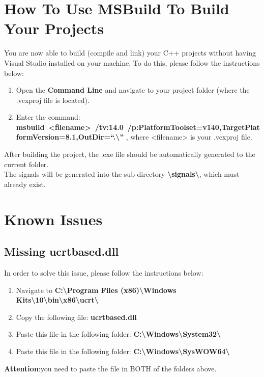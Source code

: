 \section{How To Use MSBuild To Build Your Projects}
  You are now able to build (compile and link) your C++ projects without having Visual Studio installed on your machine.
  To do this, please follow the instructions below:
  \begin{enumerate}
    \item Open the \textbf{Command Line} and navigate to your project folder (where the .vcxproj file is located).
    \item Enter the command:\\ \hbox{\textbf{msbuild <filename> /tv:14.0 /p:PlatformToolset=v140,TargetPlatformVersion=8.1,OutDir=``.\textbackslash{}''}} , where <filename> is your .vcxproj file.
  \end{enumerate}
  After building the project, the .exe file should be automatically generated to the current folder.\\
  The signals will be generated into the sub-directory \textbf{\textbackslash{}signals\textbackslash{}}, which must already exist.
\section{Known Issues}
  \subsection{Missing ucrtbased.dll}
  In order to solve this issue, please follow the instructions below:
  \begin{enumerate}
     \item Navigate to \textbf{C:\textbackslash{}Program Files (x86)\textbackslash{}Windows Kits\textbackslash{}10\textbackslash{}bin\textbackslash{}x86\textbackslash{}ucrt\textbackslash{}}
     \item Copy the following file: \textbf{ucrtbased.dll}
     \item Paste this file in the following folder: \textbf{C:\textbackslash{}Windows\textbackslash{}System32\textbackslash{}}
     \item Paste this file in the following folder: \textbf{C:\textbackslash{}Windows\textbackslash{}SysWOW64\textbackslash{}}
   \end{enumerate}
   \textbf{Attention}:you need to paste the file in BOTH of the folders above.
